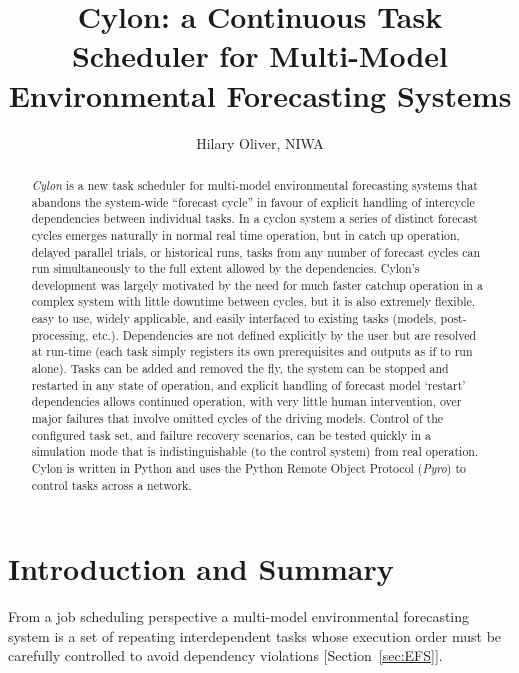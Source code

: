 \documentclass[11pt,a4paper]{article}
\title{Cylon: a Continuous Task Scheduler for Multi-Model Environmental
Forecasting Systems}
\author{Hilary Oliver, NIWA}
\begin{document}
\maketitle

\pagebreak
\tableofcontents
\pagebreak

\begin{abstract}

    {\em Cylon} is a new task scheduler for multi-model environmental
    forecasting systems that abandons the system-wide ``forecast cycle''
    in favour of explicit handling of intercycle dependencies between
    individual tasks. In a cyclon system a series of distinct forecast
    cycles emerges naturally in normal real time operation, but in catch
    up operation, delayed parallel trials, or historical runs, tasks
    from any number of forecast cycles can run simultaneously to the
    full extent allowed by the dependencies.  Cylon's development was
    largely motivated by the need for much faster catchup operation in a
    complex system with little downtime between cycles, but it is also
    extremely flexible, easy to use, widely applicable, and easily
    interfaced to existing tasks (models, post-processing, etc.).
    Dependencies are not defined explicitly by the user but are resolved
    at run-time (each task simply registers its own prerequisites and
    outputs as if to run alone). Tasks can be added and removed the fly,
    the system can be stopped and restarted in any state of operation,
    and explicit handling of forecast model `restart' dependencies
    allows continued operation, with very little human intervention,
    over major failures that involve omitted cycles of the driving
    models. Control of the configured task set, and failure recovery
    scenarios, can be tested quickly in a simulation mode that is
    indistinguishable (to the control system) from real operation. Cylon
    is written in Python and uses the Python Remote Object Protocol
    ({\em Pyro}) to control tasks across a network.  

\end{abstract}


\section{Introduction and Summary}

From a job scheduling perspective a multi-model environmental
forecasting system is a set of repeating interdependent tasks whose
execution order must be carefully controlled to avoid dependency
violations [Section~\ref{sec:EFS}]. 
\end{document}
